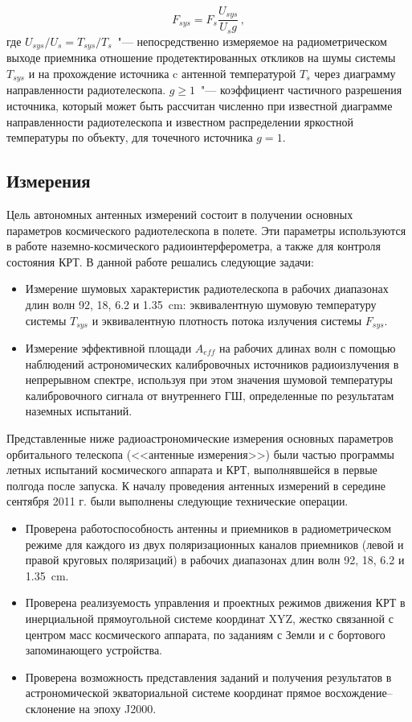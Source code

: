 \begin{equation}
 F_{sys}  = F_s \frac{U_{sys}}{U_s g} \,,
\end{equation}
где $U_{sys}/U_s = T_{sys}/T_s$~"--- непосредственно измеряемое на радиометрическом выходе
приемника отношение продетектированных откликов на шумы
системы $T_{sys}$ и на прохождение источника c антенной температурой $T_s$ через диаграмму
направленности радиотелескопа. $g \geqslant 1$~"--- коэффициент частичного разрешения источника,
который может быть рассчитан численно при известной диаграмме направленности радиотелескопа
и известном распределении яркостной температуры по объекту, для точечного источника $g = 1$.

\subsection{Измерения}

Цель автономных антенных измерений состоит
в получении основных параметров космического радиотелескопа в полете. Эти параметры используются в
работе наземно-космического радиоинтерферометра, а также для контроля состояния КРТ.
В данной работе решались следующие задачи:

\begin{itemize}
 \item Измерение шумовых характеристик радиотелескопа в рабочих диапазонах длин волн 92, 18,
6.2 и \SI{1.35}{\cm}: эквивалентную шумовую температуру системы $T_{sys}$ и эквивалентную плотность
потока излучения системы $F_{sys}$.
 \item Измерение эффективной площади $A_{eff}$ на
рабочих длинах волн с помощью наблюдений астрономических калибровочных источников радиоизлучения в
непрерывном спектре, используя при этом значения шумовой температуры калибровочного сигнала от
внутреннего ГШ, определенные по результатам наземных испытаний.
\end{itemize}

Представленные ниже радиоастрономические
измерения основных параметров орбитального телескопа (<<антенные измерения>>) были частью программы
летных испытаний космического аппарата
и КРТ, выполнявшейся в первые полгода после
запуска. К началу проведения антенных
измерений в середине сентября 2011 г. были
выполнены следующие технические операции.

\begin{itemize}
 \item Проверена работоспособность антенны и
приемников в радиометрическом режиме для каждого из двух поляризационных каналов приемников
(левой и правой круговых поляризаций) в рабочих диапазонах длин волн 92, 18, 6.2 и \SI{1.35}{\cm}.
 \item Проверена реализуемость управления и проектных режимов движения КРТ в инерциальной
прямоугольной системе координат XYZ, жестко связанной с центром масс космического аппарата,
по заданиям с Земли и с бортового запоминающего устройства.
 \item  Проверена возможность представления заданий и получения результатов в астрономической
экваториальной системе координат прямое восхождение--склонение на эпоху J2000.
\end{itemize}

